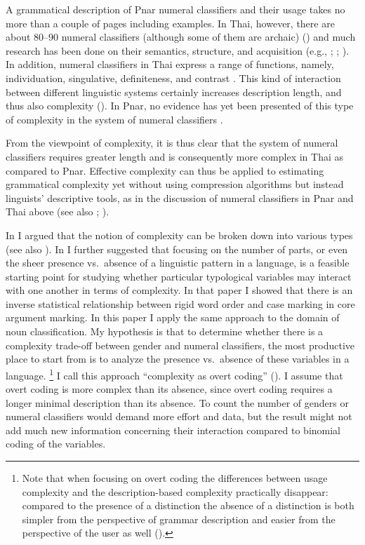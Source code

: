 \documentclass[output=collectionpaper]{langsci/langscibook}
\begin{document}
A grammatical description of Pnar numeral classifiers and their usage takes no more than a couple of pages including examples. In Thai, however, there are about 80--90 numeral classifiers (although some of them are archaic) (\citealt[74]{Iwasaki2005}) and much research has been done on their semantics, structure, and acquisition  (e.g., \citealt{Hundius1983}; \citealt{Gandour1984}; \citealt{Inglis2003}). In addition, numeral classifiers in Thai express a range of functions, namely, individuation, singulative, definiteness, and contrast \citep{Bisang2009}. This kind of interaction between different linguistic systems certainly increases description length, and thus also complexity (\citealt{Sinnemaeki2014}). In Pnar, no evidence has yet been presented of this type of complexity in the system of numeral classifiers \citep[360--368]{Ring2015}.

From the viewpoint of complexity, it is thus clear that the system of numeral classifiers requires greater length \textendash{} and is consequently more complex \textendash{} in Thai as compared to Pnar. Effective complexity can thus be applied to estimating grammatical complexity yet without using compression algorithms but instead linguists' descriptive tools, as in the discussion of numeral classifiers in Pnar and Thai above (see also \citealt{Miestamo2008}; \citealt{Sinnemaeki2014}).

In \citet{Sinnemaeki2011} I argued that the notion of complexity can be broken down into various types (see also \citealt{Good2012}). In \citet{Sinnemaeki2014} I further suggested that focusing on the number of parts, or even the sheer presence vs.\ absence of a linguistic pattern in a language, is a feasible starting point for studying whether particular typological variables may interact with one another in terms of complexity. In that paper I showed that there is an inverse statistical relationship between rigid word order and case marking in core argument marking. In this paper I apply the same approach to the domain of noun classification. My hypothesis is that to determine whether there is a complexity trade-off between gender and numeral classifiers, the most productive place to start from is to analyze the presence vs.\ absence of these variables in a language.%
\footnote{Note that when focusing on overt coding the differences between usage complexity and the description-based complexity practically disappear: compared to the presence of a distinction the absence of a distinction is both simpler from the perspective of grammar description and easier from the perspective of the user as well (\citealt[127--128]{Sinnemaeki2009}).} %
I call this approach ``complexity as overt coding'' (\citealt{Sinnemaeki2014}). I assume that overt coding is more complex than its absence, since overt coding requires a longer minimal description than its absence. To count the number of genders or numeral classifiers would demand more effort and data, but the result might not add much new information concerning their interaction compared to binomial coding of the variables.
\end{document}
